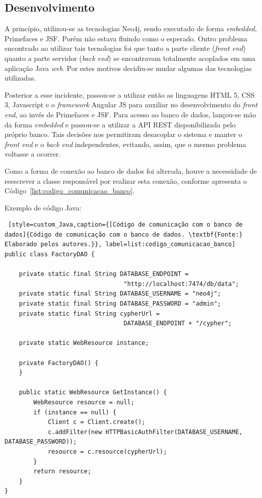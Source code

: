 \subsection{Desenvolvimento}

\par A princípio, utilizou-se as tecnologias Neo4j, sendo executado de forma \textit{embedded}, Primefaces e JSF. Porém não estava fluindo como o esperado. Outro problema encontrado ao utilizar tais tecnologias foi que tanto a parte cliente (\textit{front end}) quanto a parte servidor (\textit{back end}) se encontravam totalmente acoplados em uma aplicação Java \textit{web}. Por estes motivos decidiu-se mudar algumas das tecnologias utilizadas.

\par Posterior a esse incidente, passou-se a utilizar então as linguagens HTML 5, CSS 3, Javascript e o \textit{framework} Angular JS para auxiliar no desenvolvimento do \textit{front end}, ao invés de Primefaces e JSF. Para acesso ao banco de dados, lançou-se mão da forma \textit{embedded} e passou-se a utilizar a API REST disponibilizada pelo próprio banco. Tais decisões nos permitiram desacoplar o sistema e manter o \textit{front end} e o \textit{back end} independentes, evitando, assim, que o mesmo problema voltasse a ocorrer.

\par Como a forma de conexão ao banco de dados foi alterada, houve a necessidade de reescrever a classe responsável por realizar esta conexão, conforme apresenta o Código~\ref{list:codigo_comunicacao_banco}.


Exemplo de código Java:

\begin{lstlisting} [style=custom_Java,caption={[Código de comunicação com o banco de dados]{Código de comunicação com o banco de dados. \textbf{Fonte:} Elaborado pelos autores.}}, label=list:codigo_comunicacao_banco] 	
public class FactoryDAO {

	private static final String DATABASE_ENDPOINT =
								 "http://localhost:7474/db/data";
	private static final String DATABASE_USERNAME = "neo4j";
	private static final String DATABASE_PASSWORD = "admin";
	private static final String cypherUrl = 
								 DATABASE_ENDPOINT + "/cypher";
	
	private static WebResource instance;
	
	private FactoryDAO() {
	}
	
	public static WebResource GetInstance() {
		WebResource resource = null;
		if (instance == null) {
			Client c = Client.create();
			c.addFilter(new HTTPBasicAuthFilter(DATABASE_USERNAME, DATABASE_PASSWORD));
			resource = c.resource(cypherUrl);
		}
		return resource;
	}
}
\end{lstlisting}

